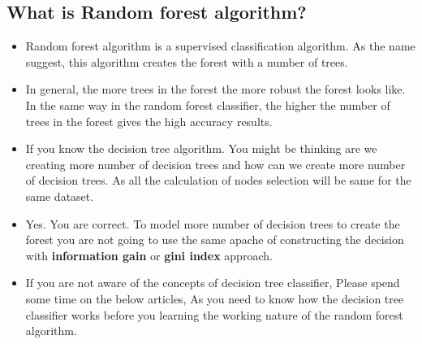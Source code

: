 \documentclass[a4paper,12pt]{article}
\begin{document}
\subsection*{What is Random forest algorithm?}
\begin{itemize}
	\item Random forest algorithm is a supervised classification algorithm. As the name suggest, this algorithm creates the forest with a number of trees.
	
	\item In general, the more trees in the forest the more robust the forest looks like. In the same way in the random forest classifier, the higher the number of trees in the forest gives the high accuracy results.
	
	\item If you know the decision tree algorithm. You might be thinking are we creating more number of decision trees and how can we create more number of decision trees. As all the calculation of nodes selection will be same for the same dataset.
	
	\item Yes. You are correct. To model more number of decision trees to create the forest you are not going to use the same apache of constructing the decision with \textbf{information gain} or \textbf{gini index} approach.
	
	\item If you are not aware of the concepts of decision tree classifier, Please spend some time on the below articles, As you need to know how the decision tree classifier works before you learning the working nature of the random forest algorithm. 
	
\end{itemize}

%
%
%
%
%
\end{document}
